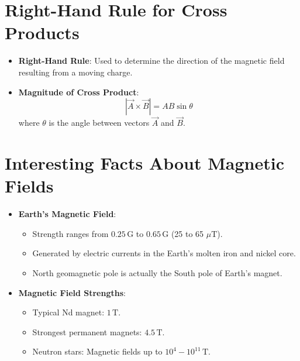 \documentclass{article}
\begin{document}
\section*{Right-Hand Rule for Cross Products}
\begin{itemize}
    \item \textbf{Right-Hand Rule}: Used to determine the direction of the magnetic field resulting from a moving charge.
    \item \textbf{Magnitude of Cross Product}:
    \[
    |\vec{A} \times \vec{B}| = AB \sin\theta
    \]
    where \(\theta\) is the angle between vectors \(\vec{A}\) and \(\vec{B}\).
\end{itemize}

\section*{Interesting Facts About Magnetic Fields}
\begin{itemize}
    \item \textbf{Earth's Magnetic Field}:
    \begin{itemize}
        \item Strength ranges from \(0.25 \, \text{G}\) to \(0.65 \, \text{G}\) (25 to 65 \(\mu\text{T}\)).
        \item Generated by electric currents in the Earth's molten iron and nickel core.
        \item North geomagnetic pole is actually the South pole of Earth's magnet.
    \end{itemize}
    \item \textbf{Magnetic Field Strengths}:
    \begin{itemize}
        \item Typical Nd magnet: \(1 \, \text{T}\).
        \item Strongest permanent magnets: \(4.5 \, \text{T}\).
        \item Neutron stars: Magnetic fields up to \(10^4 - 10^{11} \, \text{T}\).
    \end{itemize}
\end{itemize}
\end{document}
